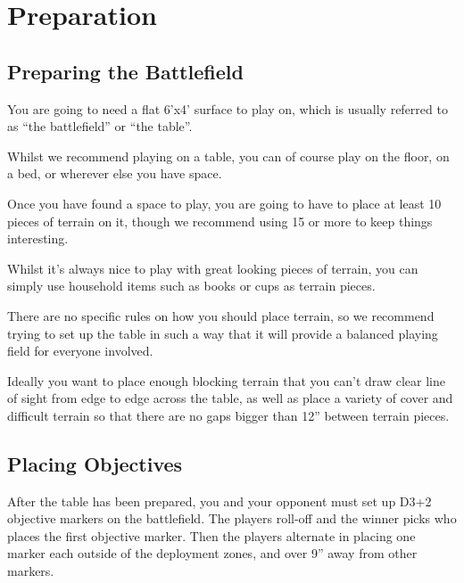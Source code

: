 \documentclass[9pt, a4paper, bookmarks=false]{extarticle}            %
\begin{document}
\newpage



\section{Preparation}

\begin{multicols}{2}

\subsection{Preparing the Battlefield}

You are going to need a flat 6’x4’ surface to play on, which is usually referred to as “the battlefield” or “the table”.

Whilst we recommend playing on a table, you can of course play on the floor, on a bed, or wherever else you have space.

Once you have found a space to play, you are going to have to place at least 10 pieces of terrain on it, though we recommend using 15 or more to keep things interesting.

Whilst it’s always nice to play with great looking pieces of terrain, you can simply use household items such as books or cups as terrain pieces.

There are no specific rules on how you should place terrain, so we recommend trying to set up the table in such a way that it will provide a balanced playing field for everyone involved.

Ideally you want to place enough blocking terrain that you can’t draw clear line of sight from edge to edge across the table, as well as place a variety of cover and difficult terrain so that there are no gaps bigger than 12” between terrain pieces.

\subsection{Placing Objectives}

After the table has been prepared, you and your opponent must set up D3+2 objective markers on the battlefield.
The players roll-off and the winner picks who places the first objective marker. Then the players alternate in placing one marker each outside of the deployment zones, and over 9” away from other markers.


\end{multicols}
\end{document}
